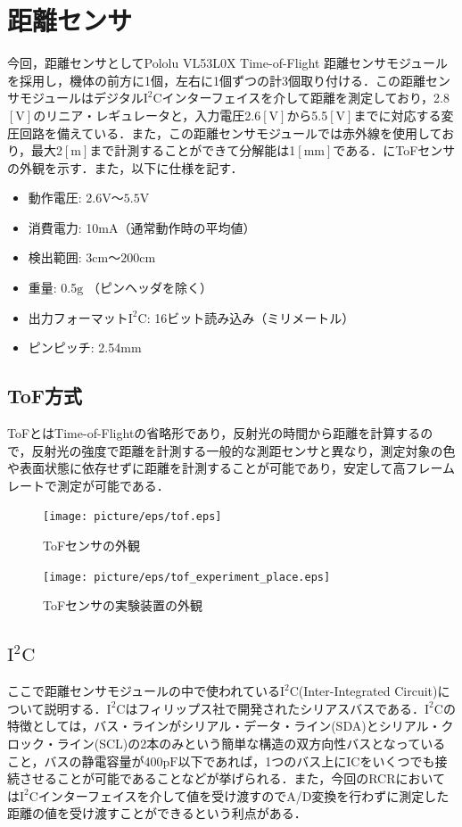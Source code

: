 \section{距離センサ}
今回，距離センサとしてPololu VL53L0X Time-of-Flight 距離センサモジュールを採用し，機体の前方に1個，左右に1個ずつの計3個取り付ける．この距離センサモジュールはデジタル$\mathrm{I^{2}C}$インターフェイスを介して距離を測定しており，2.8$\mathrm{[V]}$のリニア・レギュレータと，入力電圧2.6$\mathrm{[V]}$から5.5$\mathrm{[V]}$までに対応する変圧回路を備えている．また，この距離センサモジュールでは赤外線を使用しており，最大2$\mathrm{[m]}$まで計測することができて分解能は1$\mathrm{[mm]}$である．にToFセンサの外観を示す．また，以下に仕様を記す\cite{tof_sensor1}．

\begin{itemize}
 \item 動作電圧: 2.6$\mathrm{V}〜5.5\mathrm{V}$
 \item 消費電力: 10$\mathrm{mA}$（通常動作時の平均値）
 \item 検出範囲: 3$\mathrm{cm}〜200\mathrm{cm}$
 \item 重量: 0.5$\mathrm{g}$ （ピンヘッダを除く）
 \item 出力フォーマット$\mathrm{I^{2}C}$: 16ビット読み込み（ミリメートル）
 \item ピンピッチ: 2.54$\mathrm{mm}$ 
\end{itemize}


\subsection{ToF方式}
ToFとはTime-of-Flightの省略形であり，反射光の時間から距離を計算するので，反射光の強度で距離を計測する一般的な測距センサと異なり，測定対象の色や表面状態に依存せずに距離を計測することが可能であり，安定して高フレームレートで測定が可能である\cite{tof_sensor1}．

\begin{figure}[htb]
  \centering
  \texttt{[image: picture/eps/tof.eps]}
  \caption{ToFセンサの外観}
  \label{fig::tof_sensor}
 \end{figure}

\begin{figure}[htb]
  \centering
  \texttt{[image: picture/eps/tof\_experiment\_place.eps]}
  \caption{ToFセンサの実験装置の外観}
  \label{fig::experiment_place}
\end{figure}

\subsection{$\mathrm{I^{2}C}$}
ここで距離センサモジュールの中で使われている$\mathrm{I^{2}C}$(Inter-Integrated Circuit)について説明する．$\mathrm{I^{2}C}$はフィリップス社で開発されたシリアスバスである．$\mathrm{I^{2}C}$の特徴としては，バス・ラインがシリアル・データ・ライン(SDA)とシリアル・クロック・ライン(SCL)の2本のみという簡単な構造の双方向性バスとなっていること，バスの静電容量が400$\mathrm{pF}$以下であれば，1つのバス上にICをいくつでも接続させることが可能であることなどが挙げられる．また，今回のRCRにおいては$\mathrm{I^{2}C}$インターフェイスを介して値を受け渡すのでA/D変換を行わずに測定した距離の値を受け渡すことができるという利点がある\cite{i2c}．

